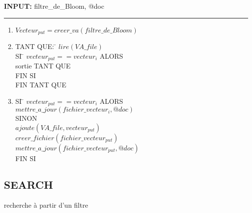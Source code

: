 \documentclass[a4paper,12pt]{report}
\begin{document}
\begin{flushleft}
	\begin{framed}
		\textbf{INPUT:} filtre\_de\_Bloom, @doc
		\noindent\rule{\linewidth}{0.5pt}

		\begin{enumerate}
		\item $ Vecteur_{put} = creer\_va(filtre\_de\_Bloom) $
		\item 
			\begin{tabbing}
				TANT QUE: \= $lire(VA\_file)$ \\
						\> SI \= $vecteur_{put} == vecteur_i$ ALORS\\
						\> \> sortie TANT QUE\\
						\> FIN SI\\
				FIN TANT QUE
	    		\end{tabbing}
		\item
			\begin{tabbing}
				SI \= $vecteur_{put} == vecteur_i $ ALORS\\
					\> $mettre\_a\_jour (fichier\_vecteur_{i}, @doc)$\\
				SINON\\
					\> $ajoute(VA\_file, vecteur_{put})$\\
					\> $creer\_fichier(fichier\_vecteur_{put})$\\
					\> $mettre\_a\_jour (fichier\_vecteur_{put}, @doc)$\\
				FIN SI
			\end{tabbing}
		\end{enumerate}
	\end{framed}
\end{flushleft}

\subsection{SEARCH}
\begin{algorithme}
	recherche à partir d'un filtre
\end{algorithme} 
\end{document}
